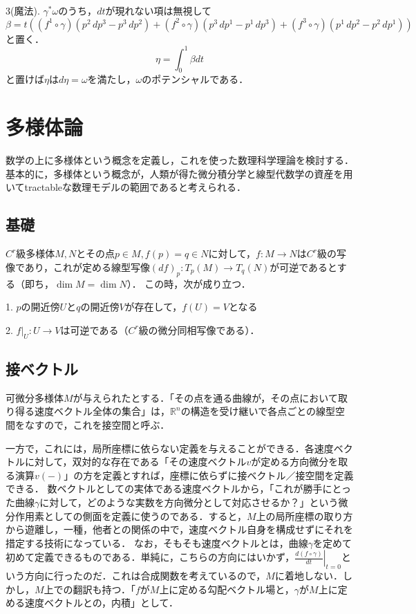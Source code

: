 \documentclass[uplatex, dvipdfmx]{jsreport}
\begin{document}
\begin{example}[ベクトルポテンシャルの求め方]
    3(魔法). $\gamma^*\omega$のうち，$dt$が現れない項は無視して
    \[ \beta=t((f^1\circ\gamma)(p^2\,dp^3-p^3\,dp^2)+(f^2\circ\gamma)(p^3\,dp^1-p^1\,dp^3)+(f^3\circ\gamma)(p^1\,dp^2-p^2\,dp^1)) \]
    と置く．\[\eta=\int_0^1\beta dt\]と置けば$\eta$は$d\eta=\omega$を満たし，$\omega$のポテンシャルである．
\end{example}

\part{多様体論}
数学の上に多様体という概念を定義し，これを使った数理科学理論を検討する．
基本的に，多様体という概念が，人類が得た微分積分学と線型代数学の資産を用いてtractableな数理モデルの範囲であると考えられる．

\chapter{基礎}

\begin{theorem}
    $C^r$級多様体$M,N$とその点$p\in M, f(p)=q\in N$に対して，$f:M\to N$は$C^r$級の写像であり，これが定める線型写像$(df)_p:T_p(M)\to T_q(N)$が可逆であるとする（即ち，$\dim M=\dim N$）．
    この時，次が成り立つ．

    1. $p$の開近傍$U$と$q$の開近傍$V$が存在して，$f(U)= V$となる
    
    2. $f|_U:U\to V$は可逆である（$C^r$級の微分同相写像である）．
\end{theorem}

\chapter{接ベクトル}

可微分多様体$M$が与えられたとする．「その点を通る曲線が，その点において取り得る速度ベクトル全体の集合」は，$\mathbb{R}^n$の構造を受け継いで各点ごとの線型空間をなすので，これを接空間と呼ぶ．

一方で，これには，局所座標に依らない定義を与えることができる．各速度ベクトルに対して，双対的な存在である「その速度ベクトル$v$が定める方向微分を取る演算$v(-)$」の方を定義とすれば，座標に依らずに接ベクトル／接空間を定義できる．
数ベクトルとしての実体である速度ベクトルから，「これが勝手にとった曲線$\gamma$に対して，どのような実数を方向微分として対応させるか？」という微分作用素としての側面を定義に使うのである．すると，$M$上の局所座標の取り方から遊離し，一種，他者との関係の中で，速度ベクトル自身を構成せずにそれを措定する技術になっている．
なお，そもそも速度ベクトルとは，曲線$\gamma$を定めて初めて定義できるものである．単純に，こちらの方向にはいかず，$\left.\frac{d (f\circ\gamma)}{dt}\right|_{t=0}$という方向に行ったのだ．これは合成関数を考えているので，$M$に着地しない．しかし，$M$上での翻訳も持つ．「$f$が$M$上に定める勾配ベクトル場と，$\gamma$が$M$上に定める速度ベクトルとの，内積」として．
\end{document}
